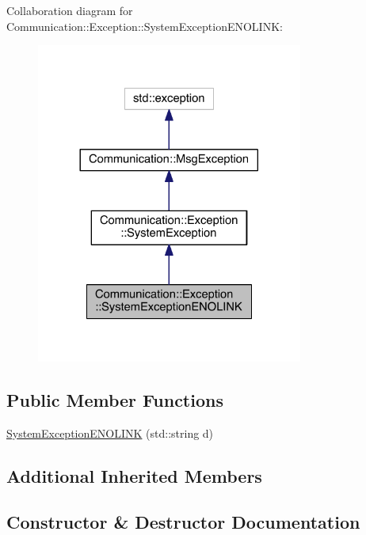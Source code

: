 Collaboration diagram for Communication\+:\+:Exception\+:\+:System\+Exception\+E\+N\+O\+L\+I\+N\+K\+:\nopagebreak
\begin{figure}[H]
\begin{center}
\leavevmode
\includegraphics[width=248pt]{class_communication_1_1_exception_1_1_system_exception_e_n_o_l_i_n_k__coll__graph}
\end{center}
\end{figure}
\subsection*{Public Member Functions}
\begin{DoxyCompactItemize}
\item 
\hyperlink{class_communication_1_1_exception_1_1_system_exception_e_n_o_l_i_n_k_abcc018eb727607238f24fee27b7c2244}{System\+Exception\+E\+N\+O\+L\+I\+N\+K} (std\+::string d)
\end{DoxyCompactItemize}
\subsection*{Additional Inherited Members}


\subsection{Constructor \& Destructor Documentation}
\hypertarget{class_communication_1_1_exception_1_1_system_exception_e_n_o_l_i_n_k_abcc018eb727607238f24fee27b7c2244}{}
